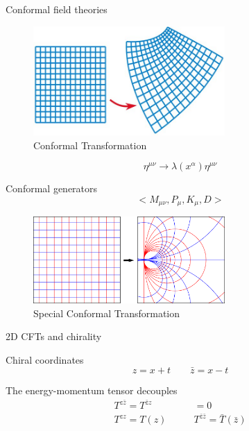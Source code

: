 \documentclass{beamer}
\begin{document}
\begin{frame}{Conformal field theories}\Large
    \begin{figure}
        \centering
        \includegraphics[width=0.65\textwidth]{conformal}
        \caption{Conformal Transformation}
    \end{figure}
    \begin{equation}
        \eta^{\mu\nu}\rightarrow \lambda(x^\alpha)\eta^{\mu\nu}
    \end{equation}
\end{frame}


\begin{frame}{Conformal generators}\Large
    \begin{equation}
        <M_{\mu\nu}, P_\mu, K_\mu, D>
    \end{equation}
    \begin{figure}
        \centering
        \includegraphics[width=0.65\textwidth]{specialconformal}
        \caption{Special Conformal Transformation}
    \end{figure}
\end{frame}


\begin{frame}{2D CFTs and chirality}
    \begin{alertblock}{Chiral coordinates}
        \begin{equation}
            z = x + t\qquad \bar{z} = x - t
        \end{equation}
    \end{alertblock}
    The energy-momentum tensor decouples
    \begin{equation}
        \begin{aligned}
            T^{z\bar{z}} = T^{\bar{z}z}& = 0 \\ T^{zz} = T(z) \qquad &T^{\bar{z}\bar{z}} = \bar{T}(\bar{z})
        \end{aligned}
    \end{equation}
\end{frame}
\end{document}
